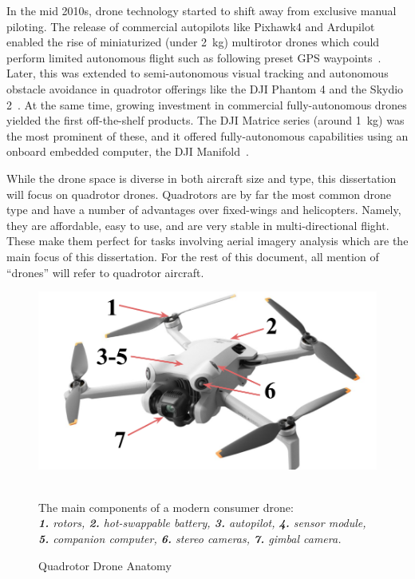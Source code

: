 In the mid 2010s, drone technology started to shift away from exclusive manual piloting. The release of commercial autopilots like Pixhawk4 and Ardupilot enabled the rise of miniaturized (under 2~kg) multirotor drones which could perform limited autonomous flight such as following preset GPS waypoints~\cite{Pixhawk,Ardupilot}. Later, this was extended to semi-autonomous visual tracking and autonomous obstacle avoidance in quadrotor offerings like the DJI Phantom 4 and the Skydio 2~\cite{DJIPhantom4,Skydio2}. At the same time, growing investment in commercial fully-autonomous drones yielded the first off-the-shelf products. The DJI Matrice series (around 1~kg) was the most prominent of these, and it offered fully-autonomous capabilities using an onboard embedded computer, the DJI Manifold~\cite{DJIMatrice}.

While the drone space is diverse in both aircraft size and type, this dissertation will focus on quadrotor drones. Quadrotors are by far the most common drone type and have a number of advantages over fixed-wings and helicopters. Namely, they are affordable, easy to use, and are very stable in multi-directional flight. These make them perfect for tasks involving aerial imagery analysis which are the main focus of this dissertation. For the rest of this document, all mention of ``drones'' will refer to quadrotor aircraft.

\begin{figure}
    \centering
    \includegraphics[width=0.75\linewidth]{chapter2/FIGS/anatomy.png}
    \begin{captext}
    \small \\ The main components of a modern consumer drone: \\\textit{\textbf{1.} rotors, \textbf{2.} hot-swappable battery, \textbf{3.} autopilot, \textbf{4.} sensor module, \\ \textbf{5.} companion computer, \textbf{6.} stereo cameras, \textbf{7.} gimbal camera.}
    \end{captext}
    \caption{Quadrotor Drone Anatomy~\cite{DJIMini4}}
    \label{fig:drone-anatomy}
\end{figure}

